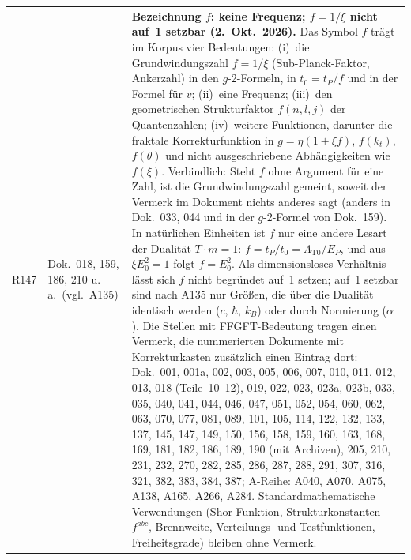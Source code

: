 \begin{longtable}{@{}p{0.9cm}p{3.1cm}p{10.2cm}@{}}
R147 & Dok.~018, 159, 186, 210 u.\,a.\ (vgl.\ A135) & \textbf{Bezeichnung $f$: keine Frequenz; $f = 1/\xi$ nicht auf~1 setzbar (2.~Okt.~2026).} Das Symbol $f$ trägt im Korpus vier Bedeutungen: (i)~die Grundwindungszahl $f = 1/\xi$ (Sub-Planck-Faktor, Ankerzahl) in den $g$-2-Formeln, in $t_0 = t_P/f$ und in der Formel für $v$; (ii)~eine Frequenz; (iii)~den geometrischen Strukturfaktor $f(n,l,j)$ der Quantenzahlen; (iv)~weitere Funktionen, darunter die fraktale Korrekturfunktion in $g = \eta(1+\xi f)$, $f(k_t)$, $f(\theta)$ und nicht ausgeschriebene Abhängigkeiten wie $f(\xi)$. Verbindlich: Steht $f$ ohne Argument für eine Zahl, ist die Grundwindungszahl gemeint, soweit der Vermerk im Dokument nichts anderes sagt (anders in Dok.~033, 044 und in der $g$-2-Formel von Dok.~159). In natürlichen Einheiten ist $f$ nur eine andere Lesart der Dualität $T\cdot m = 1$: $f = t_P/t_0 = \Lambda_{\text{T0}}/E_P$, und aus $\xi E_0^2 = 1$ folgt $f = E_0^2$. Als dimensionsloses Verhältnis lässt sich $f$ nicht begründet auf~1 setzen; auf~1 setzbar sind nach A135 nur Größen, die über die Dualität identisch werden ($c$, $\hbar$, $k_B$) oder durch Normierung ($\alpha$). Die Stellen mit FFGFT-Bedeutung tragen einen Vermerk, die nummerierten Dokumente mit Korrekturkasten zusätzlich einen Eintrag dort: Dok.~001, 001a, 002, 003, 005, 006, 007, 010, 011, 012, 013, 018 (Teile~10--12), 019, 022, 023, 023a, 023b, 033, 035, 040, 041, 044, 046, 047, 051, 052, 054, 060, 062, 063, 070, 077, 081, 089, 101, 105, 114, 122, 132, 133, 137, 145, 147, 149, 150, 156, 158, 159, 160, 163, 168, 169, 181, 182, 186, 189, 190 (mit Archiven), 205, 210, 231, 232, 270, 282, 285, 286, 287, 288, 291, 307, 316, 321, 382, 383, 384, 387; A-Reihe: A040, A070, A075, A138, A165, A266, A284. Standardmathematische Verwendungen (Shor-Funktion, Strukturkonstanten $f^{abc}$, Brennweite, Verteilungs- und Testfunktionen, Freiheitsgrade) bleiben ohne Vermerk. \\

\end{longtable}
